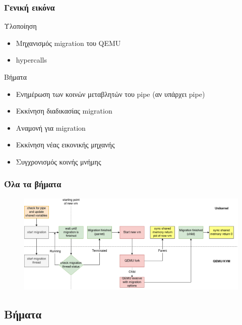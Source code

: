 \documentclass[red,slidestop,notes,compress,mathserif]{beamer}
\begin{document}
\begin{frame}
\frametitle{Γενική εικόνα}
\begin{block}{Υλοποίηση}
\begin{itemize}
\item Μηχανισμός migration του QEMU
\item hypercalls 
\end{itemize}
\end{block}
\begin{block}{Βήματα}
\begin{itemize}
\item Ενημέρωση των κοινών μεταβλητών του pipe (αν υπάρχει pipe)
\item Εκκίνηση διαδικασίας migration
\item Αναμονή για migration
\item Εκκίνηση νέας εικονικής μηχανής 
\item Συγχρονισμός κοινής μνήμης
\end{itemize}
\end{block}
\end{frame}

\begin{frame}
\frametitle{Όλα τα βήματα}
\begin{figure}
\center
\includegraphics[scale=0.33]{figures/fork_olo_colored.png}
\end{figure}
\end{frame}

\subsection{Βήματα}

\end{document}
